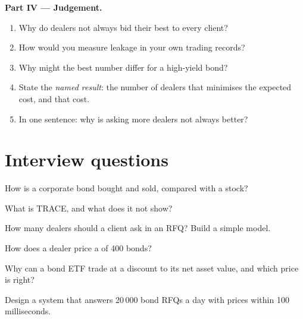 \begin{problem}
\medskip\noindent\textbf{Part IV --- Judgement.}
\begin{enumerate}[resume]
\item Why do dealers not always bid their best to every client?
\item How would you measure leakage in your own trading records?
\item Why might the best number differ for a high-yield bond?
\item State the \emph{named result}: the number of dealers that minimises the expected
cost, and that cost.
\item In one sentence: why is asking more dealers not always better?
\end{enumerate}
\end{problem}

\section{Interview questions}

\begin{interviewq}\label{iq:m2:how-bonds-trade:1}
How is a corporate bond bought and sold, compared with a stock?
\end{interviewq}

\begin{interviewq}\label{iq:m2:how-bonds-trade:2}
What is TRACE, and what does it not show?
\end{interviewq}

\begin{interviewq}\label{iq:m2:how-bonds-trade:3}
How many dealers should a client ask in an RFQ? Build a simple model.
\end{interviewq}

\begin{interviewq}\label{iq:m2:how-bonds-trade:4}
How does a dealer price a  of 400 bonds?
\end{interviewq}

\begin{interviewq}\label{iq:m2:how-bonds-trade:5}
Why can a bond ETF trade at a discount to its net asset value, and which price is
right?
\end{interviewq}

\begin{interviewq}\label{iq:m2:how-bonds-trade:6}
Design a system that answers 20\,000 bond RFQs a day with prices within 100
milliseconds.
\end{interviewq}
